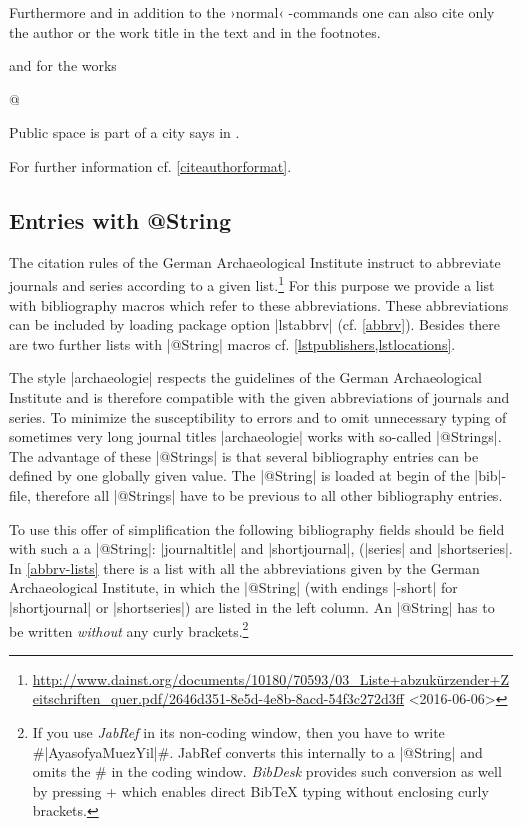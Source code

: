 \documentclass[a4paper,
10pt,
greek,
french,
spanish,
italian,
ngerman,
english
]{ltxdoc}
\begin{document}
\DescribeMacro{\citeauthor}\DescribeMacro{\citetitle}\label{citeauthor}%
Furthermore and in addition to the ›normal‹ -commands one can also cite only the author or the work title in the text and in the footnotes.
  and for the works 
\begin{code}
\citetitle*@%
\end{code} 

\begin{example}
Public space is part of a city says \citeauthor{Osland2016} in .
\end{example}
For further information cf. \cref{citeauthorformat}.

\subsection{Entries with @String}\label{string}
The citation rules of the German Archaeological Institute instruct to abbreviate journals and series according to a given list.\footnote{\url{http://www.dainst.org/documents/10180/70593/03_Liste+abzukürzender+Zeitschriften_quer.pdf/2646d351-8e5d-4e8b-8acd-54f3c272d3ff} <2016-06-06>}
For this purpose we provide a list with bibliography macros which refer to these abbreviations. 
These abbreviations can be included by loading package option |lstabbrv| (cf. \cref{abbrv}). 
Besides there are two further lists with |@String| macros cf. \cref{lstpublishers,lstlocations}.

 The style |archaeologie| respects the guidelines of the German Archaeological Institute 
and is therefore compatible with the given abbreviations of journals and series.
To minimize the susceptibility to errors and to omit unnecessary typing of sometimes very long journal titles |archaeologie| works with so-called |@Strings|.
The advantage of these |@Strings| is that several bibliography entries can be defined by one globally given value. 
The |@String| is loaded at begin of the |bib|-file, therefore all |@Strings| have to be previous to all other bibliography entries.
 
To use this offer of simplification the following bibliography fields should be field with such a a |@String|: |journaltitle| and |shortjournal|,
(|series| and |shortseries|.
In \cref{abbrv-lists} there is a list with all the abbreviations given by the German Archaeological Institute, 
in which the |@String| (with endings |-short| for |shortjournal| or |shortseries|) are listed in the left column.  
An |@String| has to be written \emph{without} any curly brackets.\footnote{If you use \emph{JabRef} in its non-coding window, 
then you have to write \#|AyasofyaMuezYil|\#. 
JabRef converts this internally to a |@String| and omits the \# in the coding window. 
\emph{BibDesk} provides such conversion as well by pressing
\LKeyStrg + 
 which enables direct BibTeX typing without enclosing curly brackets.}
\end{document}
